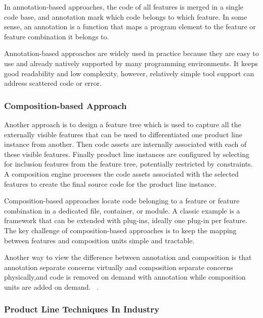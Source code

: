 In annotation-based approaches, the code of all features is merged in a single code base, and annotation mark which code
 belongs to which feature. In some sense, an annotation is a function that maps a program element to the feature or
 feature combination it belongs to.

Annotation-based approaches are widely used in practice because they are easy to use and already natively supported
by many programming environments. It keeps good readability and low complexity, however, relatively simple tool support
can address scattered code or error.




\subsubsection{Composition-based Approach}

Another approach is to design a feature tree which is used to capture all the externally visible features that
can be used to differentiated one product line instance from another. Then code assets are internally associated
 with each of these visible features. Finally product line instances are configured by selecting for inclusion
  features from the feature tree, potentially restricted by constraints. A composition engine processes the
  code assets associated with the selected features to create the final source code for the product line instance.

Composition-based approaches locate code belonging to a feature or feature combination in a dedicated file,
container, or module. A classic example is a framework that can be extended with plug-ins, ideally one plug-in
per feature. The key challenge of composition-based approaches is to keep the mapping between features and
composition units simple and tractable.

Another way to view the difference between annotation and composition is that annotation separate concerns
virtually and composition separate concerns physically,and code is removed on demand with annotation while
composition units are added on demand. ~\cite{Thum:2014:FEF:2537169.2537315}.



\subsubsection{Product Line Techniques In Industry}

